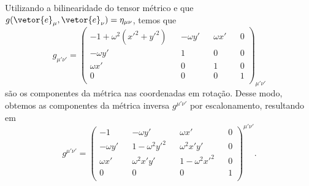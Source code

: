 Utilizando a bilinearidade do tensor métrico e que \(g(\vetor{e}_\mu, \vetor{e}_\nu) = \eta_{\mu\nu}\), temos que
\begin{equation*}
    g_{\mu'\nu'} = \begin{pmatrix}
        -1 + \omega^2(x'^2 + y'^2) && -\omega y' && \omega x' && 0\\
        -\omega y' && 1 && 0 && 0\\
        \omega x' && 0 && 1 && 0\\
        0 && 0 && 0 && 1\\
    \end{pmatrix}_{\mu'\nu'}
\end{equation*}
são os componentes da métrica nas coordenadas em rotação. Desse modo, obtemos as componentes da métrica inversa \(g^{\mu'\nu'}\) por escalonamento, resultando em
\begin{equation*}
    g^{\mu'\nu'} = \begin{pmatrix}
        -1 && -\omega y' && \omega x' && 0\\
        -\omega y' && 1-\omega^2 y'^2 && \omega^2x'y' && 0\\
        \omega x' && \omega^2x'y' && 1-\omega^2 x'^2 && 0\\
        0 && 0 && 0 && 1\\
    \end{pmatrix}^{\mu'\nu'}.
\end{equation*}
